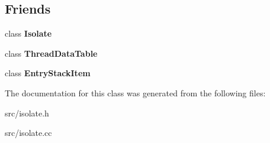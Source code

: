 \subsection*{Friends}
\begin{DoxyCompactItemize}
\item 
\hypertarget{classv8_1_1internal_1_1_isolate_1_1_per_isolate_thread_data_aba4f0964bdacf2bbf62cf876e5d28d0a}{}class {\bfseries Isolate}\label{classv8_1_1internal_1_1_isolate_1_1_per_isolate_thread_data_aba4f0964bdacf2bbf62cf876e5d28d0a}

\item 
\hypertarget{classv8_1_1internal_1_1_isolate_1_1_per_isolate_thread_data_a27444e20ddf88624d116fc0ebd8c40a9}{}class {\bfseries Thread\+Data\+Table}\label{classv8_1_1internal_1_1_isolate_1_1_per_isolate_thread_data_a27444e20ddf88624d116fc0ebd8c40a9}

\item 
\hypertarget{classv8_1_1internal_1_1_isolate_1_1_per_isolate_thread_data_a8d448be8b7e8af37a0da5811aef0eebd}{}class {\bfseries Entry\+Stack\+Item}\label{classv8_1_1internal_1_1_isolate_1_1_per_isolate_thread_data_a8d448be8b7e8af37a0da5811aef0eebd}

\end{DoxyCompactItemize}


The documentation for this class was generated from the following files\+:\begin{DoxyCompactItemize}
\item 
src/isolate.\+h\item 
src/isolate.\+cc\end{DoxyCompactItemize}
